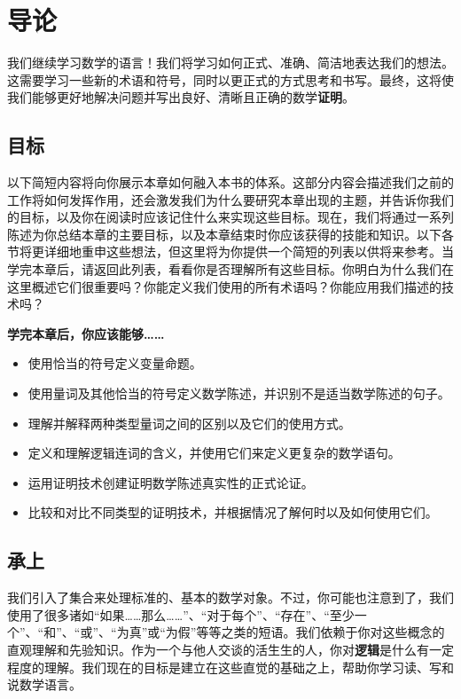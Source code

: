 \section{导论}

我们继续学习数学的语言！我们将学习如何正式、准确、简洁地表达我们的想法。这需要学习一些新的术语和符号，同时以更正式的方式思考和书写。最终，这将使我们能够更好地解决问题并写出良好、清晰且正确的数学\textbf{证明}。

\subsection{目标}

以下简短内容将向你展示本章如何融入本书的体系。这部分内容会描述我们之前的工作将如何发挥作用，还会激发我们为什么要研究本章出现的主题，并告诉你我们的目标，以及你在阅读时应该记住什么来实现这些目标。现在，我们将通过一系列陈述为你总结本章的主要目标，以及本章结束时你应该获得的技能和知识。以下各节将更详细地重申这些想法，但这里将为你提供一个简短的列表以供将来参考。当学完本章后，请返回此列表，看看你是否理解所有这些目标。你明白为什么我们在这里概述它们很重要吗？你能定义我们使用的所有术语吗？你能应用我们描述的技术吗？

\textbf{学完本章后，你应该能够……}

\begin{itemize}
    \item 使用恰当的符号定义变量命题。
    \item 使用量词及其他恰当的符号定义数学陈述，并识别不是适当数学陈述的句子。
    \item 理解并解释两种类型量词之间的区别以及它们的使用方式。
    \item 定义和理解逻辑连词的含义，并使用它们来定义更复杂的数学语句。
    \item 运用证明技术创建证明数学陈述真实性的正式论证。
    \item 比较和对比不同类型的证明技术，并根据情况了解何时以及如何使用它们。
\end{itemize}

\subsection{承上}

我们引入了集合来处理标准的、基本的数学对象。不过，你可能也注意到了，我们使用了很多诸如``如果……那么……''、``对于每个''、``存在''、``至少一个''、``和''、``或''、``为真''或``为假''等等之类的短语。我们依赖于你对这些概念的直观理解和先验知识。作为一个与他人交谈的活生生的人，你对\textbf{逻辑}是什么有一定程度的理解。我们现在的目标是建立在这些直觉的基础之上，帮助你学习读、写和说数学语言。

